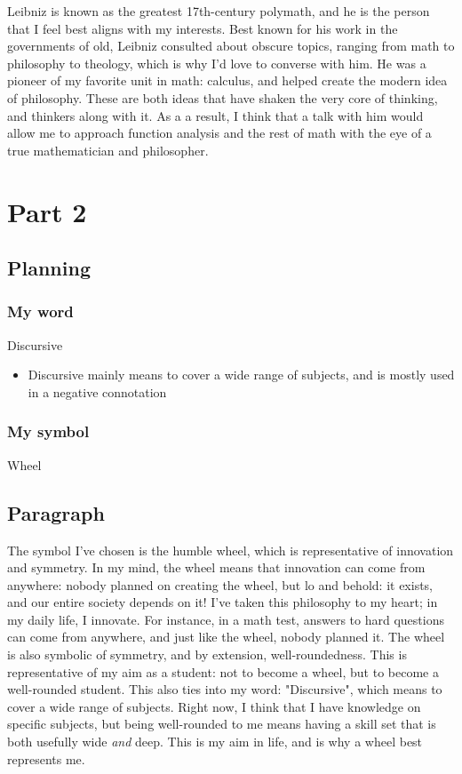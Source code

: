 \documentclass[]{article}
\begin{document}
Leibniz is known as the greatest 17th-century polymath, and he is the person that I feel best aligns with my interests. Best known for his work in the governments of old, Leibniz consulted about obscure topics, ranging from math to philosophy to theology, which is why I'd love to converse with him. 
He was a pioneer of my favorite unit in math: calculus, and helped create the modern idea of philosophy. These are both ideas that have shaken the very core of thinking, and thinkers along with it. As a a result, I think that a talk with him would allow me to approach function analysis and the rest of math with the eye of a true mathematician and philosopher.

\newpage

\section*{Part 2}
\subsection*{Planning}
\subsubsection*{My word}
Discursive
\begin{itemize}
    \item Discursive mainly means to cover a wide range of subjects, and is mostly used in a negative connotation
\end{itemize}
\subsubsection*{My symbol}
Wheel



\newpage

\subsection*{Paragraph}
The symbol I've chosen is the humble wheel, which is representative of innovation and symmetry. In my mind, the wheel means that innovation can come from anywhere: nobody planned on creating the wheel, but lo and behold: it exists, and our entire society depends on it! I've taken this philosophy to my heart; in my daily life, I innovate. For instance, in a math test, answers to hard questions can come from anywhere, and just like the wheel, nobody planned it.  The wheel is also symbolic of symmetry, and by extension, well-roundedness. This is representative of my aim as a student: not to become a wheel, but to become a well-rounded student. This also ties into my word: "Discursive", which means to cover a wide range of subjects. Right now, I think that I have knowledge on specific subjects, but being well-rounded to me means having a skill set that is both usefully wide \textit{and} deep. This is my aim in life, and is why a wheel best represents me.
\end{document}
